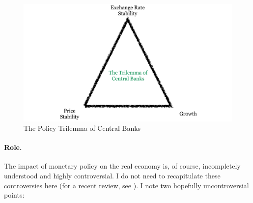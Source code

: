  \begin{figure}[htbp]
	\centering
	\includegraphics[width=1\linewidth]{./img/triangle-cb}  
	\caption{The Policy Trilemma of Central Banks}
	\label{fig:triangle-cb}
\end{figure}

\paragraph[Role]{Role.} %
The impact of monetary policy on the real economy is, of course, incompletely understood and highly controversial. I do not need to recapitulate these controversies here (for a recent review, see \citealt{Wapshott2011}). I note two hopefully uncontroversial points:


